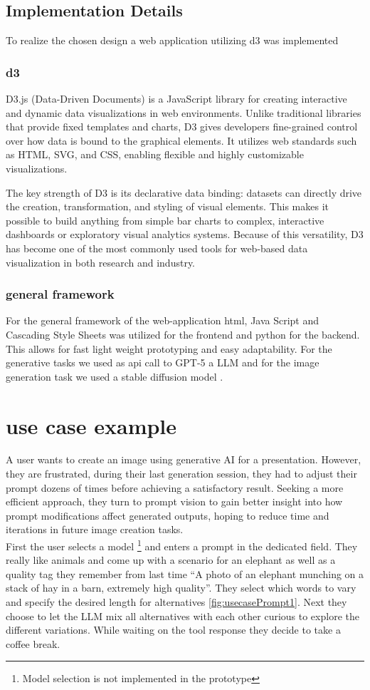 \documentclass[
  a4paper,  %
  twoside,  %
  bibliography=totoc,
  headsepline,
  cleardoublepage=empty,
  parskip=half,
  draft=false
]{scrbook}
\begin{document}
\section{Implementation Details}
To realize the chosen design a web application utilizing d3 was implemented
\subsection{d3}
D3.js (Data-Driven Documents) is a JavaScript library for creating interactive and dynamic data visualizations in web environments. Unlike traditional libraries that provide fixed templates and charts, D3 gives developers fine-grained control over how data is bound to the graphical elements. It utilizes web standards such as HTML, SVG, and CSS, enabling flexible and highly customizable visualizations.

The key strength of D3 is its declarative data binding: datasets can directly drive the creation, transformation, and styling of visual elements. This makes it possible to build anything from simple bar charts to complex, interactive dashboards or exploratory visual analytics systems. Because of this versatility, D3 has become one of the most commonly used tools for web-based data visualization in both research and industry.

\subsection{general framework}
For the general framework of the web-application html, Java Script and Cascading Style Sheets was utilized for the frontend and python for the backend.
This allows for fast light weight prototyping and easy adaptability. For the generative tasks we used as api call to GPT-5 a LLM and for the image generation task we used a stable diffusion model \cite{stableDiffusion}.
                                                                        

\chapter{use case example}
A user wants to create an image using generative AI for a presentation. However, they are frustrated, during their last generation session, they had to adjust their prompt dozens of times before achieving a satisfactory result. Seeking a more efficient approach, they turn to prompt vision to gain better insight into how prompt modifications affect generated outputs, hoping to reduce time and iterations in future image creation tasks.\\
First the user selects a model \footnote{Model selection is not implemented in the prototype} and enters a prompt in the dedicated field. They really like animals and come up with a scenario for an elephant as well as a quality tag they remember from last time \enquote{A photo of an elephant munching on a stack of hay in a barn, extremely high quality}. They select which words to vary and specify the desired length for alternatives \cref{fig:usecasePrompt1}. Next they choose to let the LLM mix all alternatives with each other curious to explore the different variations. While waiting on the tool response they decide to take a coffee break. 
\end{document}
